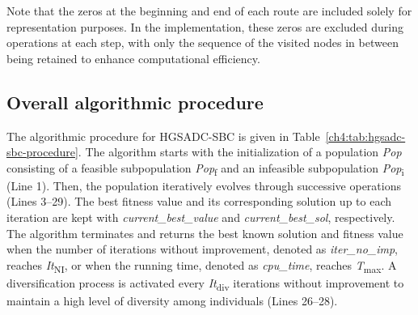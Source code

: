 Note that the zeros at the beginning and end of each route are included solely for representation
purposes. In the implementation, these zeros are excluded during operations at each step, with only
the sequence of the visited nodes in between being retained to enhance computational efficiency.

\subsection{Overall algorithmic procedure}\label{ch4:subsec:overall-algorithmic-procedure}

The algorithmic procedure for HGSADC-SBC is given in
Table~\ref{ch4:tab:hgsadc-sbc-procedure}. The algorithm starts with the
initialization of a population \emph{Pop} consisting of a feasible subpopulation
\emph{Pop}\textsubscript{f} and an infeasible subpopulation
\emph{Pop}\textsubscript{i} (Line 1). Then, the population iteratively evolves
through successive operations (Lines 3--29). The best fitness value and its
corresponding solution up to each iteration are kept with
\emph{current\_best\_value} and \emph{current\_best\_sol}, respectively.
The algorithm terminates and returns the best known solution and fitness value
when the number of iterations without improvement, denoted as
\emph{iter\_no\_imp}, reaches \emph{It}\textsubscript{NI}, or when the running
time, denoted as \emph{cpu\_time}, reaches \emph{T}\textsubscript{max}.
A diversification process is activated every \emph{It}\textsubscript{div}
iterations without improvement to maintain a high level of diversity among
individuals (Lines 26--28).

